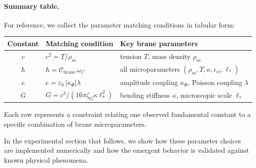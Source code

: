 \paragraph{Summary table.}
For reference, we collect the parameter matching conditions in tabular form:
%
\begin{center}
\begin{tabular}{|c|l|l|}
\hline
\textbf{Constant} & \textbf{Matching condition} & \textbf{Key brane parameters} \\
\hline
$c$ & $c^2 = T/\rho_m$ & tension $T$, mass density $\rho_m$ \\
\hline
$\hbar$ & $\hbar = \mathcal{C}_{\mathrm{brane}} \,\omega_C$ & all microparameters $(\rho_m, T, \kappa, \epsilon_{\mathrm{cr}}, \ell_\ast)$ \\
\hline
$e$ & $e = \varepsilon_0\,|\kappa_{\Phi}| \lambda$ & amplitude coupling $\kappa_{\Phi}$, Poisson coupling $\lambda$ \\
\hline
$G$ & $G = c^3/(16\pi \zeta_G \kappa \ell_\ast^2)$ & bending stiffness $\kappa$, microscopic scale $\ell_\ast$ \\
\hline
\end{tabular}
\end{center}
%
Each row represents a constraint relating one observed fundamental constant to a specific combination of brane microparameters.

In the experimental section that follows, we show how these parameter choices are implemented numerically and how the emergent behavior is validated against known physical phenomena.
